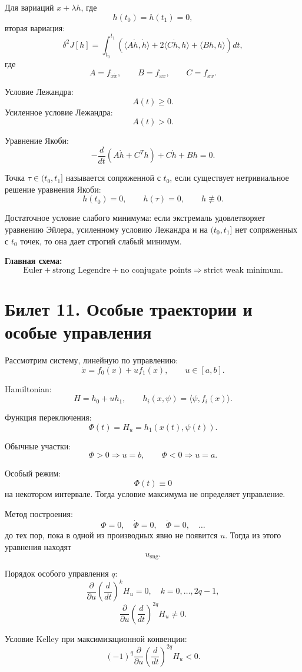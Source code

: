 \documentclass[12pt,a4paper]{article}
\newcommand{\sng}{\mathrm{sng}}
\begin{document}
Для вариаций $x+\lambda h$, где
\[
h(t_0)=h(t_1)=0,
\]
вторая вариация:
\[
\delta^2J[h]=
\int_{t_0}^{t_1}
\left(
\langle A\dot h,\dot h\rangle
+
2\langle C\dot h,h\rangle
+
\langle Bh,h\rangle
\right)dt,
\]
где
\[
A=f_{\dot x\dot x},\qquad B=f_{xx},\qquad C=f_{x\dot x}.
\]

Условие Лежандра:
\[
A(t)\ge0.
\]
Усиленное условие Лежандра:
\[
A(t)>0.
\]

Уравнение Якоби:
\[
-\frac{d}{dt}(A\dot h+C^Th)+C\dot h+Bh=0.
\]

Точка $\tau\in(t_0,t_1]$ называется сопряженной с $t_0$, если существует нетривиальное решение уравнения Якоби:
\[
h(t_0)=0,
\qquad
h(\tau)=0,
\qquad
h\not\equiv0.
\]

Достаточное условие слабого минимума: если экстремаль удовлетворяет уравнению Эйлера, усиленному условию Лежандра и на $(t_0,t_1]$ нет сопряженных с $t_0$ точек, то она дает строгий слабый минимум.

\textbf{Главная схема:}
\[
\text{Euler}+
\text{strong Legendre}+
\text{no conjugate points}
\Rightarrow
\text{strict weak minimum}.
\]

\section*{Билет 11. Особые траектории и особые управления}

Рассмотрим систему, линейную по управлению:
\[
\dot x=f_0(x)+u f_1(x),
\qquad u\in[a,b].
\]

Hamiltonian:
\[
H=h_0+u h_1,
\qquad h_i(x,\psi)=\langle\psi,f_i(x)\rangle.
\]

Функция переключения:
\[
\Phi(t)=H_u=h_1(x(t),\psi(t)).
\]

Обычные участки:
\[
\Phi>0\Rightarrow u=b,
\qquad
\Phi<0\Rightarrow u=a.
\]

Особый режим:
\[
\Phi(t)\equiv0
\]
на некотором интервале. Тогда условие максимума не определяет управление.

Метод построения:
\[
\Phi=0,
\quad \dot\Phi=0,
\quad \ddot\Phi=0,
\quad\ldots
\]
до тех пор, пока в одной из производных явно не появится $u$. Тогда из этого уравнения находят
\[
u_{\sng}.
\]

Порядок особого управления $q$:
\[
\frac{\partial}{\partial u}
\left(\frac{d}{dt}\right)^k H_u=0,
\quad k=0,\ldots,2q-1,
\]
\[
\frac{\partial}{\partial u}
\left(\frac{d}{dt}\right)^{2q}H_u\ne0.
\]

Условие Kelley при максимизационной конвенции:
\[
(-1)^q
\frac{\partial}{\partial u}
\left(\frac{d}{dt}\right)^{2q}H_u<0.
\]
\end{document}
